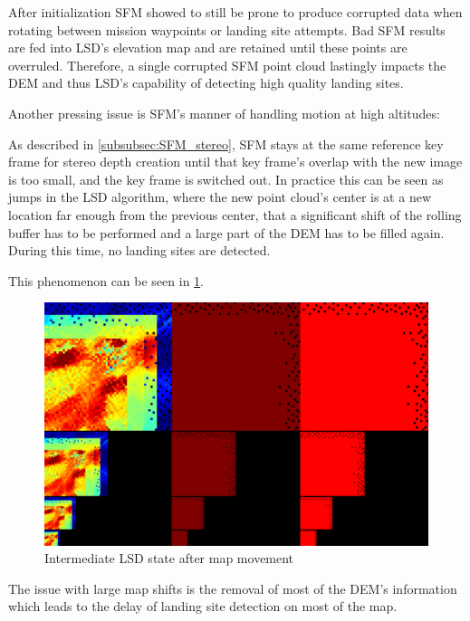 After initialization SFM showed to still be prone to produce corrupted data when rotating between mission waypoints or landing site attempts. Bad SFM results are fed into LSD's elevation map and are retained until these points are overruled. Therefore, a single corrupted SFM point cloud lastingly impacts the DEM and thus LSD's capability of detecting high quality landing sites.

Another pressing issue is SFM's manner of handling motion at high altitudes:

As described in \cref{subsubsec:SFM_stereo}, SFM stays at the same reference key frame for stereo depth creation until that key frame's overlap with the new image is too small, and the key frame is switched out. In practice this can be seen as jumps in the LSD algorithm, where the new point cloud's center is at a new location far enough from the previous center, that a significant shift of the rolling buffer has to be performed and a large part of the DEM has to be filled again. During this time, no landing sites are detected.

This phenomenon can be seen in \cref{fig:SFM_movement1}. 

\begin{figure}[h]
\centering
\includegraphics[scale=0.25]{images/evaluation/SFM_issues/Screenshot from 2024-06-20 14-41-06.png}
\caption{Intermediate LSD state after map movement}
\label{fig:SFM_movement1}
\end{figure}


The issue with large map shifts is the removal of most of the DEM's information which leads to the delay of landing site detection on most of the map.


